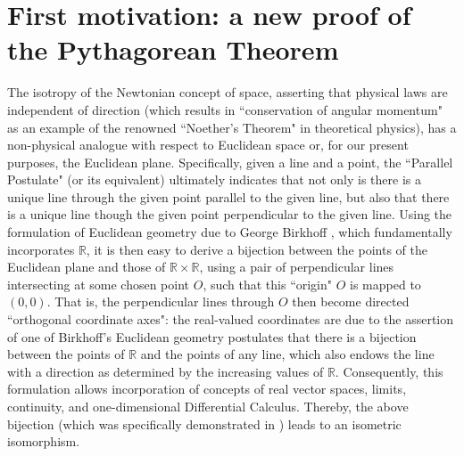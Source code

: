 \documentclass{amsart}
\numberwithin{equation}{section}
\theoremstyle{definition}
\numberwithin{theorem}{section}
\begin{document}
\vspace{1cm}

\appendix

 \section{First motivation: a  new proof of the Pythagorean Theorem}    The isotropy of the Newtonian concept of space, asserting that physical laws are independent of direction (which results in ``conservation of angular momentum" as an example of the renowned ``Noether's Theorem" in theoretical physics), has a non-physical analogue with respect to Euclidean space or, for our present purposes, the Euclidean plane.  Specifically, given a line and a point, the ``Parallel Postulate" (or its equivalent) ultimately indicates that not only is there is a unique line through the given point parallel to the given line, but also that there is a unique line though the given point perpendicular to the given line.  Using the formulation of Euclidean geometry due to George Birkhoff \cite{birkhoff:1932}, which fundamentally incorporates $\mathbb{R}$, it is then easy to derive a bijection between the points of the Euclidean plane and those of $\mathbb{R}\times\mathbb{R}$, using a pair of perpendicular lines intersecting at some chosen point $O$, such that this ``origin" $O$ is mapped to $(0,0)$.  That is, the perpendicular lines through $O$ then become directed ``orthogonal coordinate axes": the real-valued coordinates are due to the assertion of one of Birkhoff's Euclidean geometry postulates that there is a bijection between the points of $\mathbb{R}$ and the points of any line, which also endows the line with a direction as determined by the increasing values of $\mathbb{R}$.  Consequently, this formulation allows incorporation of concepts of real vector spaces, limits, continuity, and one-dimensional Differential Calculus.  Thereby, the above bijection (which was specifically demonstrated in \cite{birkhoff:1932}) leads to an isometric isomorphism. 
\end{document}
